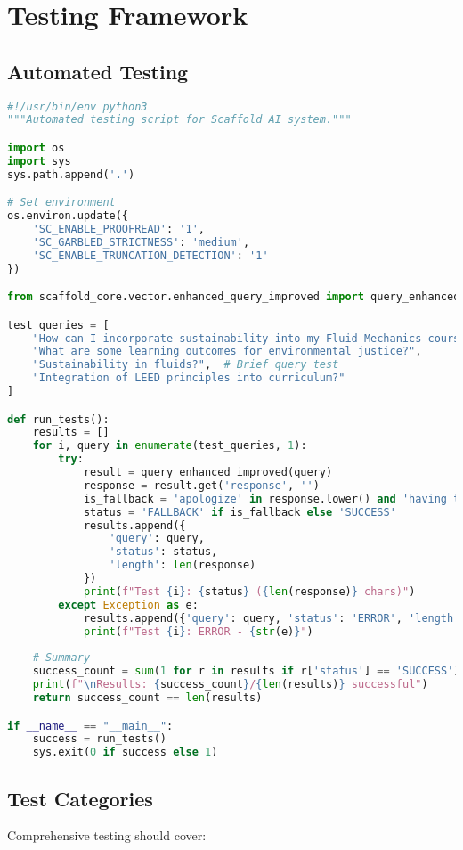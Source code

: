 \documentclass[12pt,a4paper]{article}
\begin{document}
\section{Testing Framework}

\subsection{Automated Testing}
\begin{lstlisting}[language=python, caption=Automated test script]
#!/usr/bin/env python3
"""Automated testing script for Scaffold AI system."""

import os
import sys
sys.path.append('.')

# Set environment
os.environ.update({
    'SC_ENABLE_PROOFREAD': '1',
    'SC_GARBLED_STRICTNESS': 'medium',
    'SC_ENABLE_TRUNCATION_DETECTION': '1'
})

from scaffold_core.vector.enhanced_query_improved import query_enhanced_improved

test_queries = [
    "How can I incorporate sustainability into my Fluid Mechanics course?",
    "What are some learning outcomes for environmental justice?",
    "Sustainability in fluids?",  # Brief query test
    "Integration of LEED principles into curriculum?"
]

def run_tests():
    results = []
    for i, query in enumerate(test_queries, 1):
        try:
            result = query_enhanced_improved(query)
            response = result.get('response', '')
            is_fallback = 'apologize' in response.lower() and 'having trouble' in response.lower()
            status = 'FALLBACK' if is_fallback else 'SUCCESS'
            results.append({
                'query': query,
                'status': status,
                'length': len(response)
            })
            print(f"Test {i}: {status} ({len(response)} chars)")
        except Exception as e:
            results.append({'query': query, 'status': 'ERROR', 'length': 0})
            print(f"Test {i}: ERROR - {str(e)}")
    
    # Summary
    success_count = sum(1 for r in results if r['status'] == 'SUCCESS')
    print(f"\nResults: {success_count}/{len(results)} successful")
    return success_count == len(results)

if __name__ == "__main__":
    success = run_tests()
    sys.exit(0 if success else 1)
\end{lstlisting}

\subsection{Test Categories}
Comprehensive testing should cover:
\end{document}
